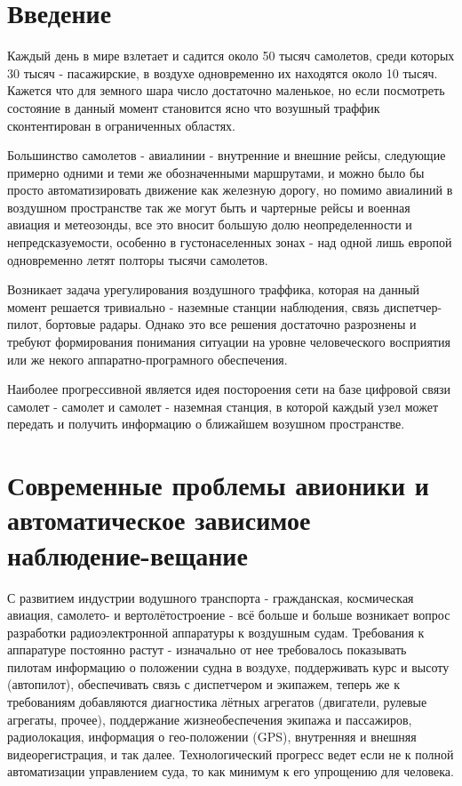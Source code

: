 \documentclass[a4paper,12pt]{report} %
\begin{document}
\tableofcontents

\setlength{\parskip}{1em}
\chapter{Введение} %

Каждый день в мире взлетает и садится около 50 тысяч самолетов, среди
которых 30 тысяч - пасажирские, в воздухе одновременно их находятся около 10
тысяч. Кажется что для земного шара число достаточно маленькое, но если
посмотреть состояние в данный момент становится ясно что возушный траффик
сконтентирован в ограниченных областях.

Большинство самолетов - авиалинии - внутренние и внешние рейсы, следующие
примерно одними и теми же обозначенными маршрутами, и можно было бы просто
автоматизировать движение как железную дорогу, но помимо авиалиний в воздушном
пространстве так же могут быть и чартерные рейсы и военная авиация и метеозонды,
все это вносит большую долю неопределенности и непредсказуемости, особенно в
густонаселенных зонах - над одной лишь европой одновременно летят полторы тысячи
самолетов.

Возникает задача урегулирования воздушного траффика, которая на данный момент
решается тривиально - наземные станции наблюдения, связь диспетчер-пилот,
бортовые радары. Однако это все решения достаточно разрознены и требуют
формирования понимания ситуации на уровне человеческого восприятия или же некого
аппаратно-програмного обеспечения.

Наиболее прогрессивной является идея постороения сети на базе цифровой связи
самолет - самолет и самолет - наземная станция, в которой каждый узел может
передать и получить информацию о ближайшем возушном пространстве.
\newpage
\chapter{Современные проблемы авионики и автоматическое зависимое
  наблюдение-вещание} %

С развитием индустрии водушного транспорта - гражданская, космическая авиация,
самолето- и вертолётостроение - всё больше и больше возникает вопрос разработки
радиоэлектронной аппаратуры к воздушным судам. Требования к аппаратуре постоянно
растут - изначально от нее требовалось показывать пилотам информацию о положении
судна в воздухе, поддерживать курс и высоту (автопилот), обеспечивать связь с
диспетчером и экипажем, теперь же к требованиям добавляются диагностика лётных
агрегатов (двигатели, рулевые агрегаты, прочее), поддержание жизнеобеспечения
экипажа и пассажиров, радиолокация, информация о гео-положении
(GPS), внутренняя и внешняя видеорегистрация, и так далее. Технологический
прогресс ведет если не к полной автоматизации управлением суда, то как минимум к
его упрощению для человека.
\end{document}
